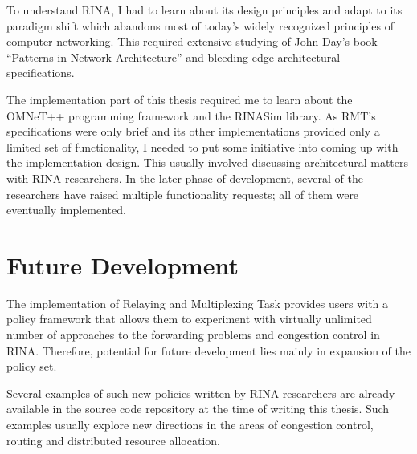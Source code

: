     To understand RINA, I had to learn about its design principles and adapt to its paradigm shift which abandons most of today's widely recognized principles of computer networking. This required extensive studying of John Day's book ``Patterns in Network Architecture'' \cite{Patterns} and bleeding-edge architectural specifications.

    The implementation part of this thesis required me to learn about the OMNeT++ programming framework and the RINASim library. As RMT's specifications were only brief and its other implementations provided only a limited set of functionality, I needed to put some initiative into coming up with the implementation design. This usually involved discussing architectural matters with RINA researchers. In the later phase of development, several of the researchers have raised multiple functionality requests; all of them were eventually implemented.

    \section{Future Development}

    The implementation of Relaying and Multiplexing Task provides users with a policy framework that allows them to experiment with virtually unlimited number of approaches to the forwarding problems and congestion control in RINA. Therefore, potential for future development lies mainly in expansion of the policy set.

    Several examples of such new policies written by RINA researchers are already available in the source code repository at the time of writing this thesis. Such examples usually explore new directions in the areas of congestion control, routing and distributed resource allocation.


